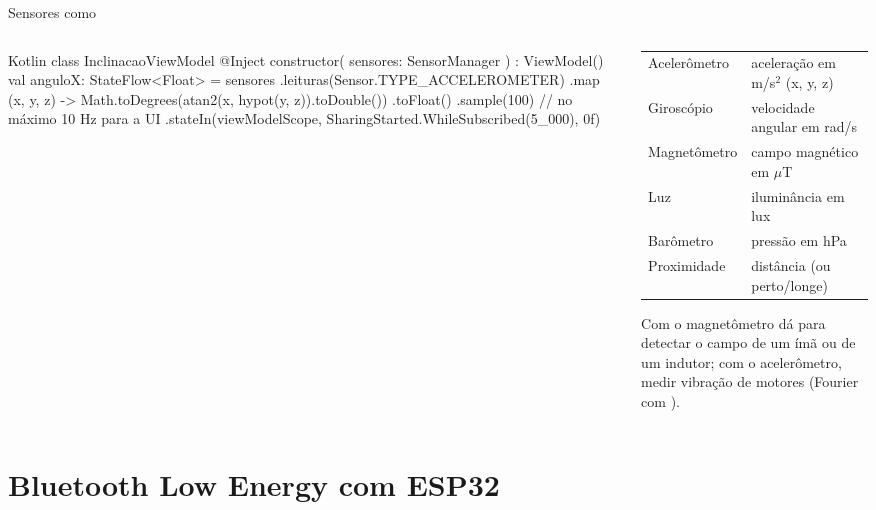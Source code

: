 \documentclass[aspectratio=169,10pt]{beamer}
\begin{document}
\begin{frame}[fragile]{Sensores como }
  \begin{columns}[T]
    \begin{column}{0.54\textwidth}
\begin{codigo}[title=Usando o callbackFlow do Módulo 03]{Kotlin}
class InclinacaoViewModel @Inject constructor(
  sensores: SensorManager
) : ViewModel() {
  val anguloX: StateFlow<Float> = sensores
    .leituras(Sensor.TYPE_ACCELEROMETER)
    .map { (x, y, z) ->
      Math.toDegrees(atan2(x, hypot(y, z)).toDouble())
        .toFloat()
    }
    .sample(100)       // no máximo 10 Hz para a UI
    .stateIn(viewModelScope,
      SharingStarted.WhileSubscribed(5_000), 0f)
}
\end{codigo}
    \end{column}
    \begin{column}{0.44\textwidth}
      \scriptsize
      \begin{tabularx}{\linewidth}{@{}l L@{}}
        \toprule
         &  \\
        \midrule
        Acelerômetro & aceleração em m/s$^2$ (x, y, z) \\
        Giroscópio & velocidade angular em rad/s \\
        Magnetômetro & campo magnético em $\mu$T \\
        Luz & iluminância em lux \\
        Barômetro & pressão em hPa \\
        Proximidade & distância (ou perto/longe) \\
        \bottomrule
      \end{tabularx}
      \begin{dica}
        Com o magnetômetro dá para detectar o campo de um ímã ou de um indutor; com o acelerômetro, medir vibração de motores (Fourier com ).
      \end{dica}
    \end{column}
  \end{columns}
\end{frame}

\section{Bluetooth Low Energy com ESP32}
\end{document}
